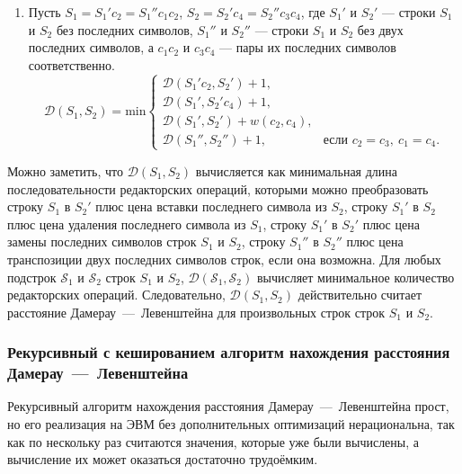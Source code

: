\begin{enumerate}
    \item Пусть $S_1 = S_1'c_2 = S_1''c_1c_2$, $S_2 = S_2'c_4 = S_2''c_3c_4$, где $S_1'$ и $S_2'$ --- строки $S_1$ и $S_2$ без последних символов, $S_1''$ и $S_2''$ --- строки $S_1$ и $S_2$ без двух последних символов, а $c_1c_2$ и $c_3c_4$ --- пары их последних символов соответственно. $$
    \mathcal{D}(S_1, S_2) = \mathrm{min} \begin{cases}
        \mathcal{D}(S_1'c_2, S_2') + 1, \\
        \mathcal{D}(S_1', S_2'c_4) + 1, \\
        \mathcal{D}(S_1', S_2') + w(c_2, c_4), \\
        \mathcal{D}(S_1'', S_2'') + 1,\ &\text{если $c_2 = c_3,\ c_1 = c_4$}.
    \end{cases}
        $$
\end{enumerate}

Можно заметить, что $\mathcal{D}(S_1, S_2)$ вычисляется как минимальная длина последовательности редакторских операций, которыми можно преобразовать строку $S_1$ в $S_2'$ плюс цена вставки последнего символа из $S_2$, строку $S_1'$ в $S_2$ плюс цена удаления последнего символа из $S_1$, строку $S_1'$ в $S_2'$ плюс цена замены последних символов строк $S_1$ и $S_2$, строку $S_1''$ в $S_2''$ плюс цена транспозиции двух последних символов строк, если она возможна.
Для любых подстрок $\mathcal{S}_1$ и $\mathcal{S}_2$ строк $S_1$ и $S_2$, $\mathcal{D}(\mathcal{S}_1, \mathcal{S}_2)$ вычисляет минимальное количество редакторских операций.
Следовательно, $\mathcal{D}(S_1, S_2)$ действительно считает расстояние Дамерау~---~Левенштейна для произвольных строк строк $S_1$ и $S_2$.

\subsubsection{Рекурсивный с кешированием алгоритм нахождения расстояния Дамерау~---~Левенштейна}

Рекурсивный алгоритм нахождения расстояния Дамерау~---~Левенштейна прост, но его реализация на ЭВМ без дополнительных оптимизаций нерациональна, так как по нескольку раз считаются значения, которые уже были вычислены, а вычисление их может оказаться достаточно трудоёмким.

